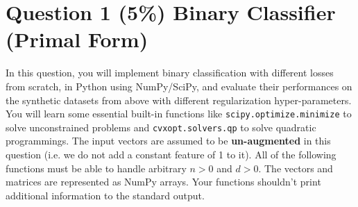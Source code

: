 \documentclass[12pt]{article}
\newcounter{ques}
\begin{document}
\section*{Question 1 (5\%) Binary Classifier (Primal Form)}
In this question, you will implement binary classification with different losses from scratch, in Python using NumPy/SciPy, and evaluate their performances on the synthetic datasets from above with different regularization hyper-parameters. You will learn some essential built-in functions like \texttt{scipy.optimize.minimize} to solve unconstrained problems and \texttt{cvxopt.solvers.qp} to solve quadratic programmings.
The input vectors are assumed to be \textbf{un-augmented} in this question (i.e. we do not add a constant feature of 1 to it). All of the following functions must be able to handle arbitrary $n > 0$ and $d > 0$. The vectors and matrices are represented as NumPy arrays. Your functions shouldn't print additional information to the
standard output.
\end{document}
